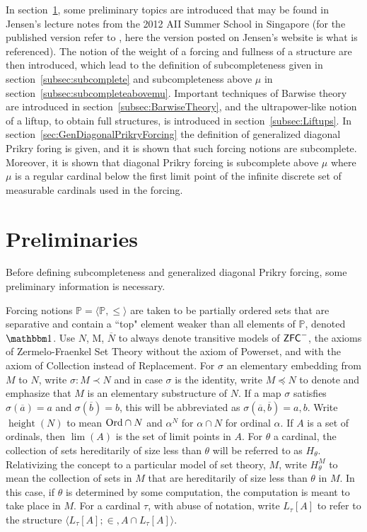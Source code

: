 \documentclass{amsart}
\theoremstyle{definition}
\theoremstyle{remark}
\renewcommand{\P}{\mathbb{P}}
\newcommand{\N}{{\overline{N}}}
\newcommand{\ZFC}{\textup{\ensuremath{\textsf{ZFC}}}}
\newcommand{\Ord}{\textup{\ensuremath{\text{Ord}}}}
\DeclareMathOperator{\height}{height}
\begin{document}
In section~\ref{sec:preliminaries}, some preliminary topics are introduced that may be found in Jensen's lecture notes from the 2012 AII Summer School in Singapore (for the published version refer to \cite{Jensen:2014}, here the version posted on Jensen's website is what is referenced). The notion of the weight of a forcing and fullness of a structure are then introduced, which lead to the definition of subcompleteness given in section~\ref{subsec:subcomplete} and subcompleteness above $\mu$ in section~\ref{subsec:subcompleteabovemu}. Important techniques of Barwise theory are introduced in section~\ref{subsec:BarwiseTheory}, and the ultrapower-like notion of a liftup, to obtain full structures, is introduced in section~\ref{subsec:Liftups}. In section~\ref{sec:GenDiagonalPrikryForcing} the definition of generalized diagonal Prikry foring is given, and it is shown that such forcing notions are subcomplete. Moreover, it is shown that diagonal Prikry forcing is subcomplete above $\mu$ where $\mu$ is a regular cardinal below the first limit point of the infinite discrete set of measurable cardinals used in the forcing.

\section{Preliminaries} \label{sec:preliminaries}
Before defining subcompleteness and generalized diagonal Prikry forcing, some preliminary information is necessary.

Forcing notions $\P = \langle \P, \leq \rangle$ are taken to be partially ordered sets that are separative and contain a ``top" element weaker than all elements of $\P$, denoted $\mathbbm 1$.
Use $N$, M, $\N$ to always denote transitive models of $\ZFC^-$, the axioms of Zermelo-Fraenkel Set Theory without the axiom of \textsf{Powerset}, and with the axiom of \textsf{Collection} instead of \textsf{Replacement}. For $\sigma$ an elementary embedding from $M$ to $N$, write $\sigma: M \prec N$ and in case $\sigma$ is the identity, write $M \preccurlyeq N$ to denote and emphasize that $M$ is an elementary substructure of $N$. 
If a map $\sigma$ satisfies $\sigma(\overline a)=a$ and $\sigma(\overline b)=b$, this will be abbreviated as $\sigma(\overline a,\overline b)=a,b$.
Write $\height(N)$ to mean $\Ord \cap N$ and $\alpha^N$ for $\alpha \cap N$ for ordinal $\alpha$.
If $A$ is a set of ordinals, then $\lim(A)$ is the set of limit points in $A$.  
For $\theta$ a cardinal, the collection of sets hereditarily of size less than $\theta$ will be referred to as $H_\theta$. Relativizing the concept to a particular model of set theory, $M$, write $H_\theta^M$ to mean the collection of sets in $M$ that are hereditarily of size less than $\theta$ in $M$. In this case, if $\theta$ is determined by some computation, the computation is meant to take place in $M$.
For a cardinal $\tau$, with abuse of notation, write $L_\tau[A]$ to refer to the structure $\langle L_\tau[A]; \in, A \cap L_\tau[A] \rangle$. 
\end{document}
